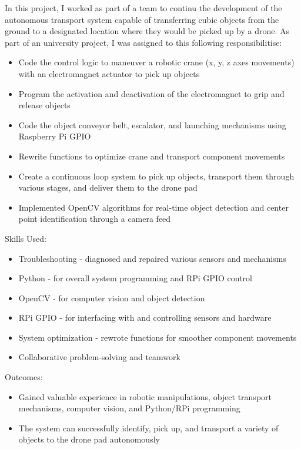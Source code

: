     {
    In this project, I worked as part of a team to continu the development of the autonomous transport system capable of transferring cubic objects from the ground to a designated location where they would be picked up by a drone.        
    As part of an university project, I was assigned to this following responsibilitise:
    \begin{itemize}
        \item Code the control logic to maneuver a robotic crane (x, y, z axes movements) with an electromagnet actuator to pick up objects
        \item Program the activation and deactivation of the electromagnet to grip and release objects
        \item Code the object conveyor belt, escalator, and launching mechanisms using Raspberry Pi GPIO
        \item Rewrite functions to optimize crane and transport component movements
        \item Create a continuous loop system to pick up objects, transport them through various stages, and deliver them to the drone pad
        \item Implemented OpenCV algorithms for real-time object detection and center point identification through a camera feed
    \end{itemize}
    \vspace{2mm}
    Skills Used:
    \begin{itemize}
        \item Troubleshooting - diagnosed and repaired various sensors and mechanisms
        \item Python - for overall system programming and RPi GPIO control
        \item OpenCV - for computer vision and object detection
        \item RPi GPIO - for interfacing with and controlling sensors and hardware
        \item System optimization - rewrote functions for smoother component movements
        \item Collaborative problem-solving and teamwork
    \end{itemize}
    \vspace{1mm}
    Outcomes:
    \begin{itemize}
        \item Gained valuable experience in robotic manipulations, object transport mechanisms, computer vision, and Python/RPi programming
        \item The system can successfully identify, pick up, and transport a variety of objects to the drone pad autonomously
    \end{itemize}
    }

